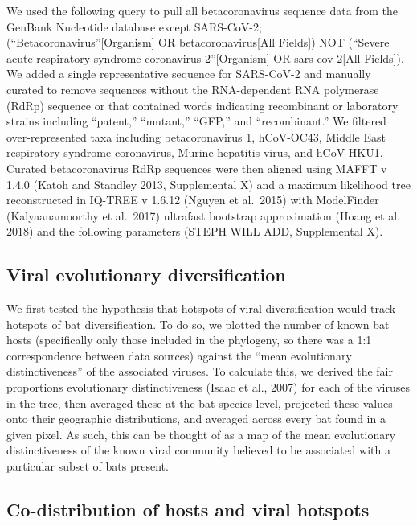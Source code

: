 \documentclass[11pt]{article}
\begin{document}
We used the following query to pull all betacoronavirus sequence data
from the GenBank Nucleotide database except SARS-CoV-2;
(``Betacoronavirus''{[}Organism{]} OR betacoronavirus{[}All Fields{]})
NOT (``Severe acute respiratory syndrome coronavirus 2''{[}Organism{]}
OR sars-cov-2{[}All Fields{]}). We added a single representative
sequence for SARS-CoV-2 and manually curated to remove sequences without
the RNA-dependent RNA polymerase (RdRp) sequence or that contained words
indicating recombinant or laboratory strains including ``patent,''
``mutant,'' ``GFP,'' and ``recombinant.'' We filtered over-represented
taxa including betacoronavirus 1, hCoV-OC43, Middle East respiratory
syndrome coronavirus, Murine hepatitis virus, and hCoV-HKU1. Curated
betacoronavirus RdRp sequences were then aligned using MAFFT v 1.4.0
(Katoh and Standley 2013, Supplemental X) and a maximum likelihood tree
reconstructed in IQ-TREE v 1.6.12 (Nguyen et al.~2015) with ModelFinder
(Kalyaanamoorthy et al.~2017) ultrafast bootstrap approximation (Hoang
et al. 2018) and the following parameters (STEPH WILL ADD, Supplemental
X).

\hypertarget{viral-evolutionary-diversification}{%
\subsection{Viral evolutionary
diversification}\label{viral-evolutionary-diversification}}

We first tested the hypothesis that hotspots of viral diversification
would track hotspots of bat diversification. To do so, we plotted the
number of known bat hosts (specifically only those included in the
phylogeny, so there was a 1:1 correspondence between data sources)
against the ``mean evolutionary distinctiveness'' of the associated
viruses. To calculate this, we derived the fair proportions evolutionary
distinctiveness (Isaac et al., 2007) for each of the viruses in the
tree, then averaged these at the bat species level, projected these
values onto their geographic distributions, and averaged across every
bat found in a given pixel. As such, this can be thought of as a map of
the mean evolutionary distinctiveness of the known viral community
believed to be associated with a particular subset of bats present.

\hypertarget{co-distribution-of-hosts-and-viral-hotspots}{%
\subsection{Co-distribution of hosts and viral
hotspots}\label{co-distribution-of-hosts-and-viral-hotspots}}
\end{document}

